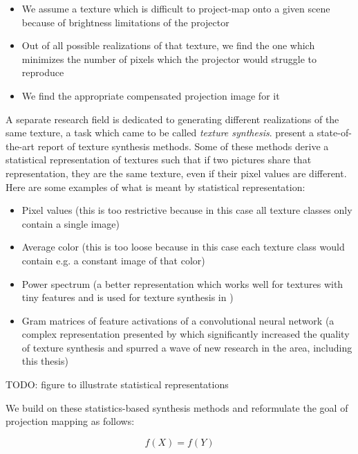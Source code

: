 \begin{itemize}
    \item We assume a texture which is difficult to project-map onto a given scene because of brightness limitations of the projector
    \item Out of all possible realizations of that texture, we find the one which minimizes the number of pixels which the projector would struggle to reproduce
    \item We find the appropriate compensated projection image for it
\end{itemize}

A separate research field is dedicated to generating different realizations of the same texture, a task which came to be called \textit{texture synthesis}. \citet*{Raad2018} present a state-of-the-art report of texture synthesis methods. Some of these methods derive a statistical representation of textures such that if two pictures share that representation, they are the same texture, even if their pixel values are different. Here are some examples of what is meant by statistical representation:

\begin{itemize}
    \item Pixel values (this is too restrictive because in this case all texture classes only contain a single image)
    \item Average color (this is too loose because in this case each texture class would contain e.g. a constant image of that color)
    \item Power spectrum (a better representation which works well for textures with tiny features and is used for texture synthesis in \citet*{Galerne2011})
    \item Gram matrices of feature activations of a convolutional neural network (a complex representation presented by \citet*{Gatys2015} which significantly increased the quality of texture synthesis and spurred a wave of new research in the area, including this thesis)
\end{itemize}

{\color{red} TODO: figure to illustrate statistical representations}

We build on these statistics-based synthesis methods and reformulate the goal of projection mapping as follows:

\begin{equation}
    \label{eq:projection_mapping-statistics}
    f(X) = f(Y)
\end{equation}

